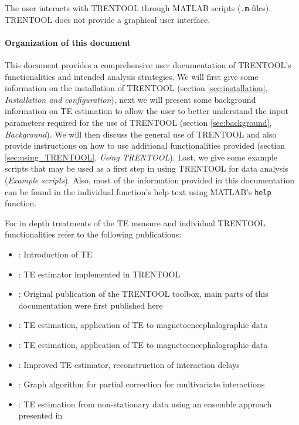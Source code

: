 \documentclass[a4paper,10pt]{article}
\begin{document}
The user interacts with TRENTOOL through MATLAB scripts (\texttt{.m}-files). TRENTOOL does not provide a graphical user interface.

\paragraph*{Organization of this document} This document provides a comprehensive user documentation of TRENTOOL's functionalities and intended analysis strategies. We will first give some information on the installation of TRENTOOL (section \ref{sec:installation}, \textit{Installation and configuration}), next we will present some background information on TE estimation to allow the user to better understand the input parameters required for the use of TRENTOOL (section \ref{sec:background}, \textit{Background}). We will then discuss the general use of TRENTOOL and also provide instructions on how to use additional functionalities provided (section \ref{sec:using_TRENTOOL}, \textit{Using TRENTOOL}). Last, we give some example scripts that may be used as a first step in using TRENTOOL for data analysis (\textit{Example scripts}). Also, most of the information provided in this documentation can be found in the individual function's help text using MATLAB's \texttt{help} function.

For in depth treatments of the TE measure and individual TRENTOOL functionalities refer to the following publications:
\begin{itemize} %
  \item {}: Introduction of TE
  \item {}: TE estimator implemented in TRENTOOL
  \item {}: Original publication of the TRENTOOL toolbox, main parts of this documentation were first published here
  \item {}: TE estimation, application of TE to magnetoencephalographic data
  \item {}: TE estimation, application of TE to magnetoencephalographic data
  \item {}: Improved TE estimator, reconstruction of interaction delays
  \item {}: Graph algorithm for partial correction for multivariate interactions 
  \item {}: TE estimation from non-stationary data using an ensemble approach presented in 
\end{itemize}
\end{document}
